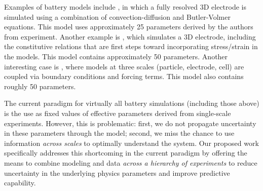 \documentclass[11pt]{article}
\begin{document}

Examples of battery models include \cite{Less:2012}, in which a fully resolved 3D electrode is simulated using a combination
of convection-diffusion and Butler-Volmer equations. This model uses approximately 25 parameters derived by the authors from experiment.
Another example is \cite{Garcia2005}, which simulates a 3D electrode, including the constitutive relations that are first steps toward
incorporating stress/strain in the models. This model contains approximately 50 parameters.  Another interesting case is \cite{Kim-etal:2011}, where models at three scales (particle, electrode, cell) are coupled via boundary conditions and forcing terms. This model also contains roughly 50 parameters.

The current paradigm for virtually all battery simulations (including those above)
 is the use as fixed values of effective parameters derived from single-scale experiments.  However, this is problematic: first, we do not propagate uncertainty in 
these parameters through the model; second, we miss the chance to use information \emph{across scales} to optimally understand
the system.  Our proposed work specifically addresses this shortcoming in the current paradigm by offering the means to 
combine modeling and data \emph{across a hierarchy of experiments}
to reduce uncertainty in the underlying physics parameters and improve predictive capability.
\end{document}
